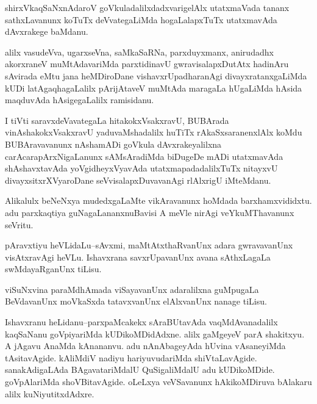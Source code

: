 \documentclass{article}
\begin{document}
\begin{mn}%
shirxVkaqSaNxnAdaroV goVkuladalilxdadxvarigelAlx utatxmaVada tananx sathxLavanunx koTuTx 
deVvategaLiMda hogaLalapxTuTx utatxmavAda dAvxrakege baMdanu.
\end{mn}

\begin{mn}%
alilx vasudeVva, ugarxseVna, saMkaSaRNa, parxduyxmanx, anirudadhx akorxraneV 
muMtAdavariMda parxtidinavU gwravisalapxDutAtx hadinAru sAvirada eMtu jana heMDiroDane 
vishavxrUpadharanAgi divayxratanxgaLiMda kUDi latAgaqhagaLalilx pArijAtaveV muMtAda 
maragaLa hUgaLiMda hAsida maqduvAda hAsigegaLalilx ramisidanu.
\end{mn}

\begin{mn}%
I tiVti saravxdeVavategaLa hitakokxVsakxravU, BUBArada vinAshakokxVsakxravU 
yaduvaMshadalilx huTiTx rAkaSxsaranenxlAlx koMdu BUBAravavanunx nAshamADi goVkula 
dAvxrakeyalilxna carAcarapArxNigaLanunx sAMsAradiMda biDugeDe mADi utatxmavAda 
shAshavxtavAda yoVgidheyxVyavAda utatxmapadadalilxTuTx nitayxvU divayxsitxrXVyaroDane 
seVvisalapxDuvavanAgi rlAlxrigU iMteMdanu.
\end{mn}

\begin{mn}%
Alikalulx beNeNxya mudedxgaLaMte vikAravanunx hoMdada barxhamxvididxtu. adu parxkaqtiya 
guNagaLananxnuBavisi A meVle nirAgi veYkuMThavanunx seVritu.
\end{mn}


\begin{mn}%
pAravxtiyu heVLidaLu--sAvxmi, maMtAtxthaRvanUnx adara gwravavanUnx visAtxravAgi heVLu. 
Ishavxrana savxrUpavanUnx avana sAthxLagaLa swMdayaRganUnx tiLisu.
\end{mn}

\begin{mn}%
viSuNxvina paraMdhAmada viSayavanUnx adaralilxna guMpugaLa BeVdavanUnx moVkaSxda 
tatavxvanUnx elAlxvanUnx nanage tiLisu.
\end{mn}

\begin{mn}%
Ishavxranu heLidanu--parxpaMcakekx sAraBUtavAda vaqMdAvanadalilx kaqSaNanu goVpiyariMda 
kUDikoMDidAdxne. alilx gaMgeyeV parA shakitxyu. A jAgavu AnaMda kAnananvu. adu 
nAnAbageyAda hUvina vAsaneyiMda tAsitavAgide. kAliMdiV nadiyu hariyuvudariMda 
shiVtaLavAgide. sanakAdigaLAda BAgavatariMdalU QuSigaliMdalU adu kUDikoMDide. 
goVpAlariMda shoVBitavAgide. oLeLxya veVSavanunx hAkikoMDiruva bAlakaru alilx 
kuNiyutitxdAdxre.
\end{mn}
\end{document}
